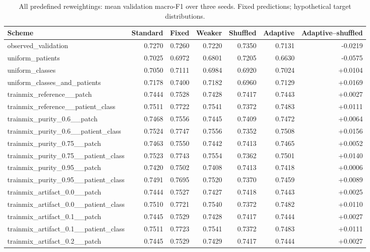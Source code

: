 \begin{table}[t]
\centering\scriptsize
\caption{All predefined reweightings: mean validation macro-F1 over three seeds. Fixed predictions; hypothetical target distributions.}
\begin{tabular}{lrrrrrr}
\hline
Scheme & Standard & Fixed & Weaker & Shuffled & Adaptive & Adaptive--shuffled \\
\hline
observed\_validation & 0.7270 & 0.7260 & 0.7220 & 0.7350 & 0.7131 & -0.0219 \\
uniform\_patients & 0.7025 & 0.6972 & 0.6801 & 0.7205 & 0.6630 & -0.0575 \\
uniform\_classes & 0.7050 & 0.7111 & 0.6984 & 0.6920 & 0.7024 & +0.0104 \\
uniform\_classes\_and\_patients & 0.7178 & 0.7400 & 0.7182 & 0.6960 & 0.7129 & +0.0169 \\
trainmix\_reference\_\_patch & 0.7444 & 0.7528 & 0.7428 & 0.7417 & 0.7443 & +0.0027 \\
trainmix\_reference\_\_patient\_class & 0.7511 & 0.7722 & 0.7541 & 0.7372 & 0.7483 & +0.0111 \\
trainmix\_purity\_0.6\_\_patch & 0.7468 & 0.7556 & 0.7445 & 0.7409 & 0.7472 & +0.0064 \\
trainmix\_purity\_0.6\_\_patient\_class & 0.7524 & 0.7747 & 0.7556 & 0.7352 & 0.7508 & +0.0156 \\
trainmix\_purity\_0.75\_\_patch & 0.7463 & 0.7550 & 0.7442 & 0.7413 & 0.7465 & +0.0052 \\
trainmix\_purity\_0.75\_\_patient\_class & 0.7523 & 0.7743 & 0.7554 & 0.7362 & 0.7501 & +0.0140 \\
trainmix\_purity\_0.95\_\_patch & 0.7420 & 0.7502 & 0.7408 & 0.7413 & 0.7418 & +0.0006 \\
trainmix\_purity\_0.95\_\_patient\_class & 0.7491 & 0.7695 & 0.7520 & 0.7370 & 0.7459 & +0.0089 \\
trainmix\_artifact\_0.0\_\_patch & 0.7444 & 0.7527 & 0.7427 & 0.7418 & 0.7443 & +0.0025 \\
trainmix\_artifact\_0.0\_\_patient\_class & 0.7510 & 0.7721 & 0.7540 & 0.7372 & 0.7482 & +0.0110 \\
trainmix\_artifact\_0.1\_\_patch & 0.7445 & 0.7529 & 0.7428 & 0.7417 & 0.7444 & +0.0027 \\
trainmix\_artifact\_0.1\_\_patient\_class & 0.7511 & 0.7723 & 0.7541 & 0.7372 & 0.7483 & +0.0111 \\
trainmix\_artifact\_0.2\_\_patch & 0.7445 & 0.7529 & 0.7429 & 0.7417 & 0.7444 & +0.0027 \\

\end{tabular}
\end{table}
